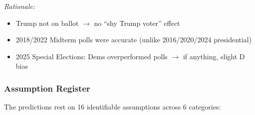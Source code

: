 \textit{Rationale:}
\begin{itemize}
    \item Trump not on ballot $\rightarrow$ no ``shy Trump voter'' effect
    \item 2018/2022 Midterm polls were accurate (unlike 2016/2020/2024 presidential)
    \item 2025 Special Elections: Dems overperformed polls $\rightarrow$ if anything, slight D bias
\end{itemize}

\subsubsection{Assumption Register}

The predictions rest on 16 identifiable assumptions across 6 categories:

